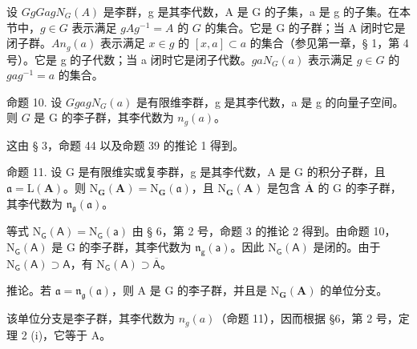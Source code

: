 设 \(G\)\(g\)\(G\)\(a\)\(g\)\(N_G(A)\) 是李群，g 是其李代数，A 是 G 的子集，a 是 g 的子集。在本节中，\(g \in G\) 表示满足 \(gAg^{-1} = A\) 的 \(G\) 的集合。它是 G 的子群；当 A 闭时它是闭子群。\(A\)\(n_g(a)\) 表示满足 \(x \in g\) 的 \([x, a] \subset a\) 的集合（参见第一章，§ 1，第 4 号）。它是 g 的子代数；当 a 闭时它是闭子代数。\(g\)\(a\)\(N_G(a)\) 表示满足 \(g \in G\) 的 \(gag^{-1} = a\) 的集合。

命题 10. 设 \(G\)\(g\)\(a\)\(g\)\(N_G(a)\) 是有限维李群，g 是其李代数，a 是 g 的向量子空间。则 \(G\) 是 G 的李子群，其李代数为 \(n_g(a)\)。

这由 § 3，命题 44 以及命题 39 的推论 1 得到。

命题 11. 设 G 是有限维实或复李群，g 是其李代数，A 是 G 的积分子群，且 \(\mathfrak{a} = \mathrm{L}(\mathbf{A})\)。则 \(\mathrm{N}_{\mathbf{G}}(\mathbf{A}) = \mathrm{N}_{\mathbf{G}}(\mathfrak{a})\)，且 \(\mathrm{N}_{\mathbf{G}}(\mathbf{A})\) 是包含 \(\overline{\mathbf{A}}\) 的 G 的李子群，其李代数为 \(\mathfrak{n}_{\mathfrak{g}}(\mathfrak{a})\)。

等式 \(\mathrm{N}_{\mathsf{G}}(\mathsf{A}) = \mathrm{N}_{\mathsf{G}}(\mathsf{a})\) 由 § 6，第 2 号，命题 3 的推论 2 得到。由命题 10，\(\mathrm{N}_{\mathsf{G}}(\mathsf{A})\) 是 G 的李子群，其李代数为 \(\mathfrak{n}_{\mathsf{g}}(\mathsf{a})\)。因此 \(\mathrm{N}_{\mathsf{G}}(\mathsf{A})\) 是闭的。由于 \(\mathrm{N}_{\mathsf{G}}(\mathsf{A}) \supset \mathsf{A}\)，有 \(\mathrm{N}_{\mathsf{G}}(\mathsf{A}) \supset \overline{\mathsf{A}}\)。

推论。若 \(\mathfrak{a} = \mathfrak{n}_{\mathfrak{g}}(\mathfrak{a})\)，则 A 是 G 的李子群，并且是 \(\mathrm{N}_{\mathbf{G}}(\mathbf{A})\) 的单位分支。

该单位分支是李子群，其李代数为 \(n_{g}(a)\)（命题 11），因而根据 §6，第 2 号，定理 2 (i)，它等于 A。
